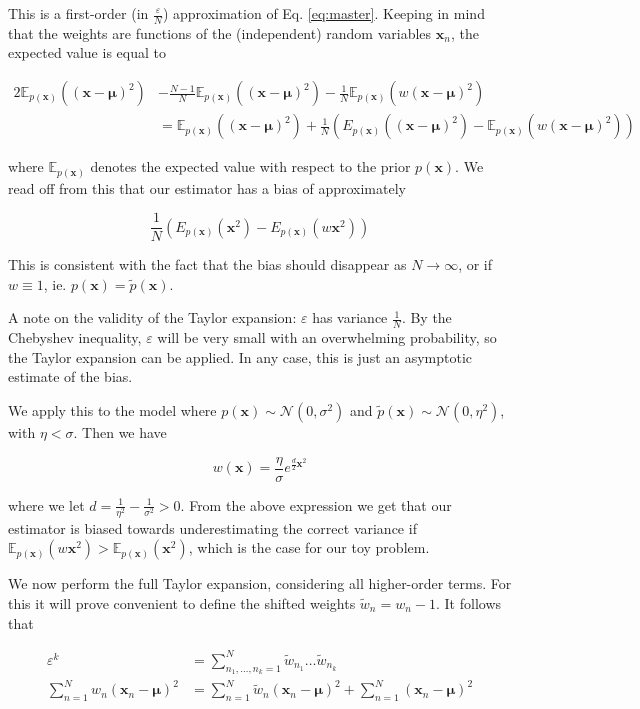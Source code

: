 \documentclass[10pt,english]{article}
\newcommand{\E}{\mathbb{E}}
\newcommand{\mathbold}[1]{\ensuremath{\boldsymbol{\mathbf{#1}}}}
\newcommand{\bx}{\mathbold{x}}
\newcommand{\bmu}{\mathbold{\mu}}
\newcommand{\ptilde}{{\tilde{p}(\bx)}}
\newcommand{\px}{{p(\bx)}}
\def\eps{\varepsilon}
\begin{document}
\noindent This is a first-order (in $\frac \eps N$) approximation of Eq. \ref{eq:master}. Keeping in mind that the weights are functions of the (independent) random variables $\bx_n$, the expected value is equal to

\begin{align*}
2 \E_\px((\bx - \bmu)^2) &- \frac {N-1}{N} \E_\px((\bx - \bmu)^2) - \frac 1 N \E_\px(w(\bx - \bmu)^2) \\
&= \E_\px((\bx - \bmu)^2) + \frac 1 N \left(E_\px((\bx - \bmu)^2) - \E_\px(w(\bx - \bmu)^2)\right)
\end{align*} 

\noindent where $\E_\px$ denotes the expected value with respect to the prior $\px$. We read off from this that our estimator has a bias of approximately 

\[ \frac 1 {N} \left(E_\px(\bx^2) - E_\px(w\bx^2)\right) \]

\noindent This is consistent with the fact that the bias should disappear as $N \rightarrow \infty$, or if $w \equiv 1$, ie. $\px = \ptilde$.

A note on the validity of the Taylor expansion: $\eps$ has variance $\frac 1 N$. By the Chebyshev inequality, $\eps$ will be very small with an overwhelming probability, so the Taylor expansion can be applied. In any case, this is just an asymptotic estimate of the bias.

We apply this to the model where $\px \sim \mathcal{N}(0, \sigma^2)$ and $\ptilde \sim \mathcal{N}(0, \eta^2)$, with $\eta < \sigma$. Then we have

\[ w(\bx) = \frac{\eta}{\sigma} e^{\frac d 2 \bx^2} \]

\noindent where we let $d = \frac{1}{\eta^2} - \frac{1}{\sigma^2} > 0$. From the above expression we get that our estimator is biased towards underestimating the correct variance if $\E_\px(w\bx^2) > \E_\px(\bx^2)$, which is the case for our toy problem.


We now perform the full Taylor expansion, considering all higher-order terms. For this it will prove convenient to define the shifted weights $\tilde w_n = w_n - 1$. It follows that

\begin{align} \label{eq:wshifttrick}
\eps^k &= \sum_{n_1,\ldots,n_k=1}^N \tilde w_{n_1} \ldots \tilde w_{n_k} \nonumber \\
\sum_{n=1}^N w_n (\bx_n - \bmu)^2 &= \sum_{n=1}^N \tilde w_n (\bx_n - \bmu)^2 + \sum_{n=1}^N (\bx_n - \bmu)^2
\end{align}
\end{document}
